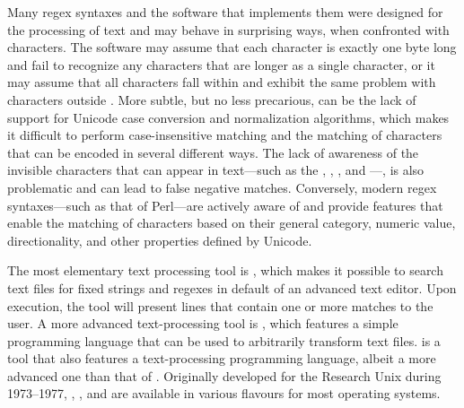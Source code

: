 \documentclass{book}
\begin{document}
Many regex syntaxes and the software that implements them were designed for the
processing of  text and may behave in surprising ways, when
confronted with  characters. The software may assume that each
character is exactly one byte long and fail to recognize any characters that are
longer as a single character, or it may assume that all  characters
fall within  and exhibit the same problem with characters outside
. More subtle, but no less precarious, can be the lack of support
for Unicode case conversion and normalization algorithms, which makes it
difficult to perform case-insensitive matching and the matching of characters
that can be encoded in several different ways. The lack of awareness of the
invisible characters that can appear in  text---such as the
, , , and ---, is also problematic
and can lead to false negative matches. Conversely, modern regex syntaxes---such
as that of Perl---are actively aware of  and provide features that
enable the matching of characters based on their general category, numeric
value, directionality, and other properties defined by Unicode.


The most elementary text processing  tool is ,
which makes it possible to search text files for fixed strings and regexes in
default of an advanced text editor. Upon execution, the tool will present lines
that contain one or more matches to the user. A more advanced text-processing
 tool is , which features a simple programming
language that can be used to arbitrarily transform text files.  is
a  tool that also features a text-processing programming
language, albeit a more advanced one than that of . Originally
developed for the Research Unix during 1973--1977, , ,
and  are available in various flavours for most operating systems.


\end{document}
